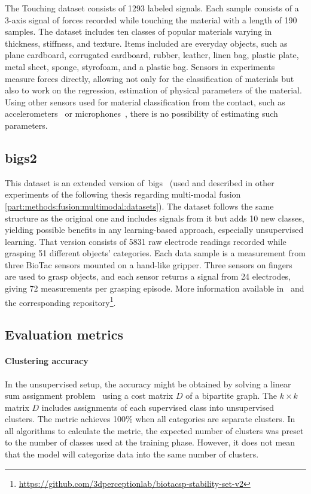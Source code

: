 \documentclass[a4paper, 10pt, twoside]{report}
\begin{document}
The Touching dataset consists of 1293 labeled signals. Each sample consists of a 3-axis signal of forces recorded while touching the material with a length of 190 samples. The dataset includes ten classes of popular materials varying in thickness, stiffness, and texture. Items included are everyday objects, such as plane cardboard, corrugated cardboard, rubber, leather, linen bag, plastic plate, metal sheet, sponge, styrofoam, and a plastic bag. Sensors in experiments measure forces directly, allowing not only for the classification of materials but also to work on the regression, \ie estimation of physical parameters of the material. Using other sensors used for material classification from the contact, such as accelerometers~\cite{DALLAIRE2014422} or microphones~\cite{Kroemer11}, there is no possibility of estimating such parameters.

\subsection{\acrfull{bigs2}}
This dataset is an extended version of~\acrshort{bigs}~\cite{bigs} (used and described in other experiments of the following thesis regarding multi-modal fusion \ref{part:methods:fusion:multimodal:datasets}). The dataset follows the same structure as the original one and includes signals from it but adds 10 new classes, yielding possible benefits in any learning-based approach, especially unsupervised learning. That version consists of 5831 raw electrode readings recorded while grasping 51 different objects' categories. Each data sample is a measurement from three BioTac sensors mounted on a hand-like gripper. Three sensors on fingers are used to grasp objects, and each sensor returns a signal from 24 electrodes, giving 72 measurements per grasping episode. More information available in~\cite{biotac2} and the corresponding repository\footnote{\url{https://github.com/3dperceptionlab/biotacsp-stability-set-v2}}.

\subsection{Evaluation metrics}
\label{part:methods:materials:classification:metrics}

\paragraph{Clustering accuracy}
In the unsupervised setup, the accuracy might be obtained by solving a linear sum assignment problem~\cite{linear_sum_assignment} using a cost matrix $D$ of a bipartite graph. The $k \times k$  matrix $D$ includes assignments of each supervised class into unsupervised clusters. The metric achieves 100\% when all categories are separate clusters. In all algorithms to calculate the metric, the expected number of clusters was preset to the number of classes used at the training phase. However, it does not mean that the model will categorize data into the same number of clusters.
\end{document}
